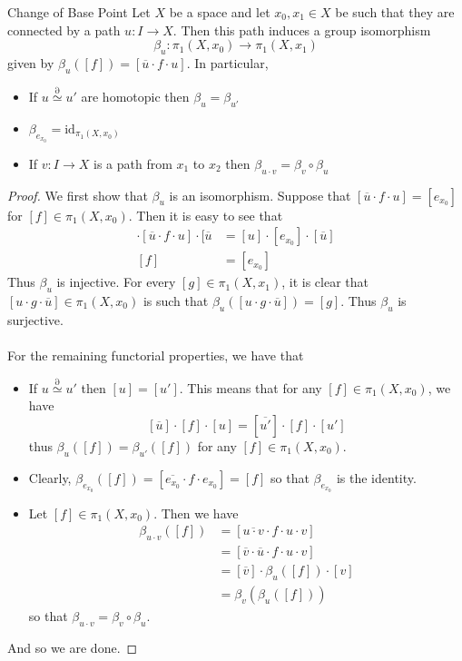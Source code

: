 \documentclass[a4paper]{article}
\begin{document}
\begin{thm}{Change of Base Point}{} Let $X$ be a space and let $x_0,x_1\in X$ be such that they are connected by a path $u:I\to X$. Then this path induces a group isomorphism $$\beta_u:\pi_1(X,x_0)\to\pi_1(X,x_1)$$ given by $\beta_u([f])=[\overline{u}\cdot f\cdot u]$. In particular, 
\begin{itemize}
\item If $u\overset{\partial}{\simeq} u'$ are homotopic then $\beta_u=\beta_{u'}$
\item $\beta_{e_{x_0}}=\text{id}_{\pi_1(X,x_0)}$
\item If $v:I\to X$ is a path from $x_1$ to $x_2$ then $\beta_{u\cdot v}=\beta_v\circ\beta_u$
\end{itemize} \tcbline
\begin{proof}
We first show that $\beta_u$ is an isomorphism. Suppose that $[\overline{u}\cdot f\cdot u]=[e_{x_0}]$ for $[f]\in\pi_1(X,x_0)$. Then it is easy to see that 
\begin{align*}
[u]\cdot[\overline{u}\cdot f\cdot u]\cdot[\overline{u}&=[u]\cdot[e_{x_0}]\cdot[\overline{u}]\\
[f]&=[e_{x_0}]
\end{align*}
Thus $\beta_u$ is injective. For every $[g]\in\pi_1(X,x_1)$, it is clear that $[u\cdot g\cdot\overline{u}]\in\pi_1(X,x_0)$ is such that $\beta_u([u\cdot g\cdot\overline{u}])=[g]$. Thus $\beta_u$ is surjective. \\~\\

For the remaining functorial properties, we have that 
\begin{itemize}
\item If $u\overset{\partial}{\simeq} u'$ then $[u]=[u']$. This means that for any $[f]\in\pi_1(X,x_0)$, we have $$[\overline{u}]\cdot[f]\cdot[u]=[\overline{u'}]\cdot[f]\cdot[u']$$ thus $\beta_u([f])=\beta_{u'}([f])$ for any $[f]\in\pi_1(X,x_0)$. 
\item Clearly, $\beta_{e_{x_0}}([f])=[\overline{e_{x_0}}\cdot f\cdot e_{x_0}]=[f]$ so that $\beta_{e_{x_0}}$ is the identity. 
\item Let $[f]\in\pi_1(X,x_0)$. Then we have 
\begin{align*}
\beta_{u\cdot v}([f])&=[\overline{u\cdot v}\cdot f\cdot u\cdot v]\\
&=[\overline{v}\cdot\overline{u}\cdot f\cdot u\cdot v]\\
&=[\overline{v}]\cdot\beta_u([f])\cdot[v]\\
&=\beta_v(\beta_u([f]))
\end{align*}
so that $\beta_{u\cdot v}=\beta_v\circ\beta_u$. 
\end{itemize}
And so we are done. 
\end{proof}
\end{thm}
\end{document}
